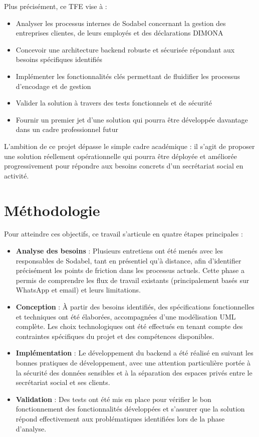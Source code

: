 \documentclass[12pt,a4paper]{report}
\begin{document}
Plus précisément, ce TFE vise à :
\begin{itemize}
  \item Analyser les processus internes de Sodabel concernant la gestion des entreprises clientes, de leurs employés et des déclarations DIMONA
  \item Concevoir une architecture backend robuste et sécurisée répondant aux besoins spécifiques identifiés
  \item Implémenter les fonctionnalités clés permettant de fluidifier les processus d'encodage et de gestion
  \item Valider la solution à travers des tests fonctionnels et de sécurité
  \item Fournir un premier jet d'une solution qui pourra être développée davantage dans un cadre professionnel futur
\end{itemize}

L'ambition de ce projet dépasse le simple cadre académique : il s'agit de proposer une solution réellement opérationnelle qui pourra être déployée et améliorée progressivement pour répondre aux besoins concrets d'un secrétariat social en activité.

\section{Méthodologie}

Pour atteindre ces objectifs, ce travail s'articule en quatre étapes principales :

\begin{itemize}
  \item \textbf{Analyse des besoins} : Plusieurs entretiens ont été menés avec les responsables de Sodabel, tant en présentiel qu'à distance, afin d'identifier précisément les points de friction dans les processus actuels. Cette phase a permis de comprendre les flux de travail existants (principalement basés sur WhatsApp et email) et leurs limitations.

  \item \textbf{Conception} : À partir des besoins identifiés, des spécifications fonctionnelles et techniques ont été élaborées, accompagnées d'une modélisation UML complète. Les choix technologiques ont été effectués en tenant compte des contraintes spécifiques du projet et des compétences disponibles.

  \item \textbf{Implémentation} : Le développement du backend a été réalisé en suivant les bonnes pratiques de développement, avec une attention particulière portée à la sécurité des données sensibles et à la séparation des espaces privés entre le secrétariat social et ses clients.

  \item \textbf{Validation} : Des tests ont été mis en place pour vérifier le bon fonctionnement des fonctionnalités développées et s'assurer que la solution répond effectivement aux problématiques identifiées lors de la phase d'analyse.
\end{itemize}
\end{document}
